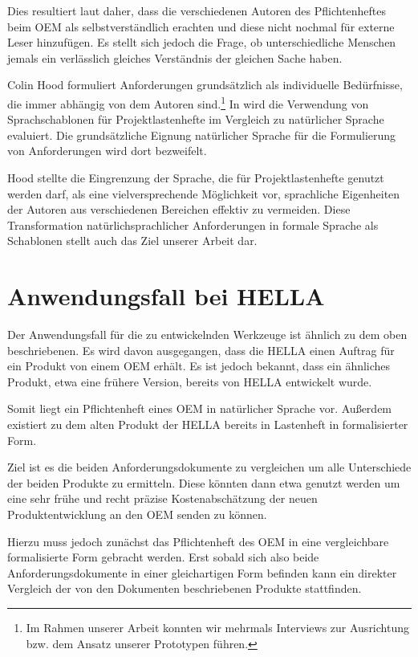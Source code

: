 \documentclass[12pt]{report}
\begin{document}
Dies resultiert laut \cite{pr15} daher, dass die verschiedenen Autoren des Pflichtenheftes beim OEM als selbstverständlich erachten und diese nicht nochmal für externe Leser hinzufügen. Es stellt sich jedoch die Frage, ob unterschiedliche Menschen jemals ein verlässlich gleiches Verständnis der gleichen Sache haben. 

Colin Hood formuliert Anforderungen grundsätzlich als \glqq individuelle Bedürfnisse\grqq{}, die immer abhängig von dem Autoren sind.\footnote{Im Rahmen unserer Arbeit konnten wir mehrmals Interviews zur Ausrichtung bzw. dem Ansatz unserer Prototypen führen.} In wird die Verwendung von Sprachschablonen für Projektlastenhefte im Vergleich zu natürlicher Sprache evaluiert. Die grundsätzliche Eignung natürlicher Sprache für die Formulierung von Anforderungen wird dort bezweifelt. 

Hood stellte die Eingrenzung der Sprache, die für Projektlastenhefte genutzt werden darf, als eine vielversprechende Möglichkeit vor, sprachliche Eigenheiten der Autoren aus verschiedenen Bereichen effektiv zu vermeiden. Diese Transformation natürlichsprachlicher Anforderungen in formale Sprache als Schablonen stellt auch das Ziel unserer Arbeit dar.

\section{Anwendungsfall bei HELLA} 

Der Anwendungsfall für die zu entwickelnden Werkzeuge ist ähnlich zu dem oben beschriebenen. Es wird davon ausgegangen, dass die HELLA einen Auftrag für ein Produkt von einem OEM erhält. Es ist jedoch bekannt, dass ein ähnliches Produkt, etwa eine frühere Version, bereits von HELLA entwickelt wurde.

Somit liegt ein Pflichtenheft eines OEM in natürlicher Sprache vor. Außerdem existiert zu dem alten Produkt der HELLA bereits in Lastenheft in formalisierter Form.

Ziel ist es die beiden Anforderungsdokumente zu vergleichen um alle Unterschiede der beiden Produkte zu ermitteln. Diese könnten dann etwa genutzt werden um eine sehr frühe und recht präzise Kostenabschätzung der neuen Produktentwicklung an den OEM senden zu können. 

Hierzu muss jedoch zunächst das Pflichtenheft des OEM in eine vergleichbare formalisierte Form gebracht werden. Erst sobald sich also beide Anforderungsdokumente in einer gleichartigen Form befinden kann ein direkter Vergleich der von den Dokumenten beschriebenen Produkte stattfinden. 
\end{document}
